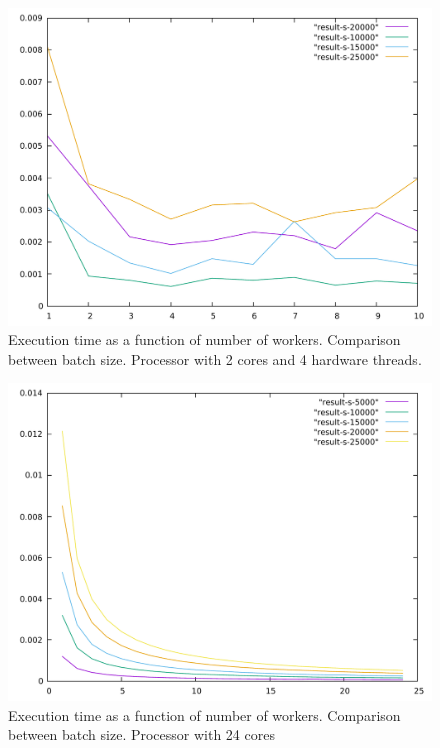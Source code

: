 \documentclass[journal]{IEEEtran}
\begin{document}
\begin{figure}[h]
\centering
\includegraphics[width=\textwidth]{../result-pal/comparison}
\caption{Execution time as a function of number of workers. Comparison between batch size. Processor with 2 cores and 4 hardware threads.}
\label{fig:comparison}
\end{figure}

\begin{figure}[h]
	\centering
	\includegraphics[width=\textwidth]{../result-pal-24/comparison}
	\caption{Execution time as a function of number of workers. Comparison between batch size. Processor with 24 cores}
	\label{fig:comparison-24}
\end{figure}




\printbibliography

%
%
\end{document}
